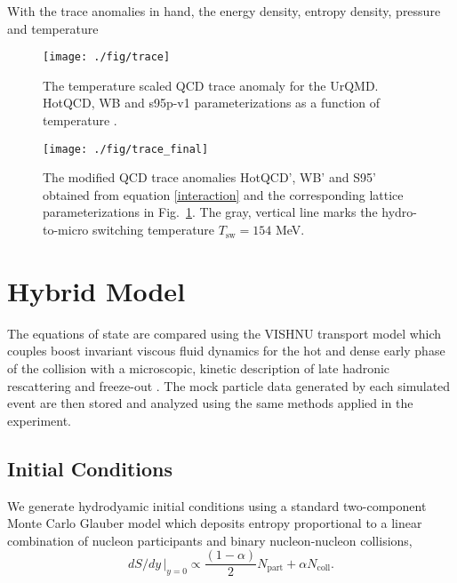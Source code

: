 \documentclass[aps,prc,reprint,amsmath,nofootinbib,superscriptaddress]{revtex4-1}
\begin{document}
With the trace anomalies in hand, the energy density, entropy density, pressure and temperature 


\begin{figure}[t]
  \texttt{[image: ./fig/trace]}
  \caption{\label{fig:trace} The temperature scaled QCD trace anomaly for the UrQMD. HotQCD, WB and s95p-v1 parameterizations as a function of temperature \cite{?}.}
\end{figure}

\begin{figure}[b]
  \texttt{[image: ./fig/trace\_final]}
  \caption{\label{fig:trace_final} The modified QCD trace anomalies HotQCD', WB' and S95' obtained from equation \eqref{interaction} and the corresponding lattice
	  parameterizations in Fig.~\ref{fig:trace}. The gray, vertical line marks the hydro-to-micro switching temperature $T_\text{sw} = 154$ MeV.}
\end{figure}

\section{Hybrid Model}

The equations of state are compared using the VISHNU transport model which couples boost invariant viscous fluid dynamics \cite{?} for the hot and dense early 
phase of the collision with a microscopic, kinetic description of late hadronic rescattering and freeze-out \cite{?}. The mock particle data generated by each 
simulated event are then stored and analyzed using the same methods applied in the experiment.

\subsection{Initial Conditions}

We generate hydrodyamic initial conditions using a standard two-component Monte Carlo Glauber model which deposits entropy proportional to a linear combination 
of nucleon participants and binary nucleon-nucleon collisions,
\begin{equation}
 dS/dy \,\vert_{y=0} \propto \frac{(1-\alpha)}{2}N_\text{part} + \alpha N_\text{coll}.
 \label{twocomponent}
\end{equation}
\end{document}
